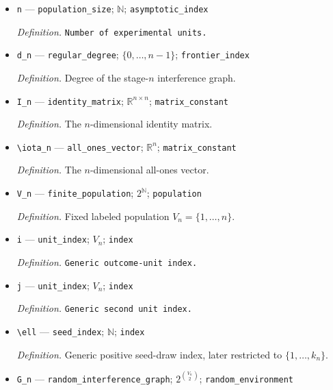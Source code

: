\documentclass{article}
\begin{document}
\begin{itemize}
  \item \texttt{n} --- \texttt{population\_\allowbreak{}size}; \(\mathbb N\); \texttt{asymptotic\_\allowbreak{}index}
  \par\smallskip\noindent\emph{Definition.} \texttt{Number of experimental units.}
  \item \texttt{d\_\allowbreak{}n} --- \texttt{regular\_\allowbreak{}degree}; \(\{0,\ldots,n-1\}\); \texttt{frontier\_\allowbreak{}index}
  \par\smallskip\noindent\emph{Definition.} Degree of the stage-\(n\) interference graph.
  \item \texttt{I\_\allowbreak{}n} --- \texttt{identity\_\allowbreak{}matrix}; \(\mathbb R^{n\times n}\); \texttt{matrix\_\allowbreak{}constant}
  \par\smallskip\noindent\emph{Definition.} The \(n\)-dimensional identity matrix.
  \item \texttt{\textbackslash{}\allowbreak{}iota\_\allowbreak{}n} --- \texttt{all\_\allowbreak{}ones\_\allowbreak{}vector}; \(\mathbb R^n\); \texttt{matrix\_\allowbreak{}constant}
  \par\smallskip\noindent\emph{Definition.} The \(n\)-dimensional all-ones vector.
  \item \texttt{V\_\allowbreak{}n} --- \texttt{finite\_\allowbreak{}population}; \(2^{\mathbb N}\); \texttt{population}
  \par\smallskip\noindent\emph{Definition.} Fixed labeled population \(V_n=\{1,\ldots,n\}\).
  \item \texttt{i} --- \texttt{unit\_\allowbreak{}index}; \(V_n\); \texttt{index}
  \par\smallskip\noindent\emph{Definition.} \texttt{Generic outcome-\allowbreak{}unit index.}
  \item \texttt{j} --- \texttt{unit\_\allowbreak{}index}; \(V_n\); \texttt{index}
  \par\smallskip\noindent\emph{Definition.} \texttt{Generic second unit index.}
  \item \texttt{\textbackslash{}\allowbreak{}ell} --- \texttt{seed\_\allowbreak{}index}; \(\mathbb N\); \texttt{index}
  \par\smallskip\noindent\emph{Definition.} Generic positive seed-draw index, later restricted to \(\{1,\ldots,k_n\}\).
  \item \texttt{G\_\allowbreak{}n} --- \texttt{random\_\allowbreak{}interference\_\allowbreak{}graph}; \(2^{\binom{V_n}{2}}\); \texttt{random\_\allowbreak{}environment}

\end{itemize}
\end{document}
